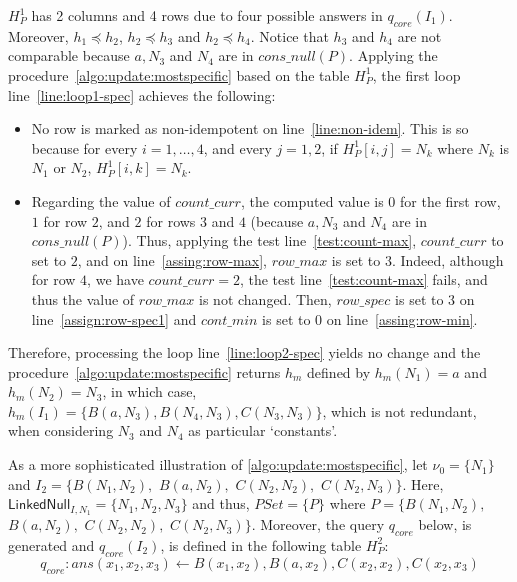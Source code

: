 \begin{example}
    $H_P^1$ has 2 columns and 4 rows due to four possible answers in $q_{core}(I_1)$.
    Moreover, $h_1 \preceq h_2$, $h_2 \preceq h_3$ and $h_2 \preceq h_4$.
    Notice that $h_3$ and $h_4$ are not comparable because $a, N_3$ and $N_4$ are in $cons\_null(P)$.
    Applying the procedure~\ref{algo:update:mostspecific} based on the table $H_P^1$, the first loop line~\ref{line:loop1-spec} achieves the following:
    \begin{itemize}
        \item
              No row is marked as non-idempotent on line~\ref{line:non-idem}.
              This is so because for every $i=1, \ldots, 4$, and every $j=1,2$, if $H^1_P[i,j]=N_k$ where $N_k$ is $N_1$ or $N_2$, $H^1_P[i,k]=N_k$.
        \item Regarding the value of $count\_curr$, the computed value is $0$ for the first row, $1$ for row $2$, and $2$ for rows $3$ and $4$ (because $a, N_3$ and $N_4$ are in $cons\_null(P)$).
              Thus, applying the test line~\ref{test:count-max}, $count\_curr$ to set to $2$, and on line~\ref{assing:row-max}, $row\_max$ is set to $3$.
              Indeed, although for row $4$, we have $count\_curr = 2$, the test line~\ref{test:count-max} fails, and thus the value of $row\_max$ is not changed.
              Then, $row\_spec$ is set to $3$ on line~\ref{assign:row-spec1} and $cont\_min$ is set to $0$ on line~\ref{assing:row-min}.
    \end{itemize}
    Therefore, processing the loop line~\ref{line:loop2-spec} yields no change and the procedure~\ref{algo:update:mostspecific} returns $h_m$ defined by $h_m(N_1)=a$ and $h_m(N_2)=N_3$, in which case, $h_m(I_1)=\{B(a, N_3), B(N_4,N_3), C(N_3,N_3)\}$, which is not redundant, when considering $N_3$ and $N_4$ as particular `constants'.

    As a more sophisticated illustration of \ref{algo:update:mostspecific}, let $\nu_0=\{N_1\}$ and $I_2= \{B(N_1, N_2),$ $B(a, N_2),$ $C(N_2,N_2),$ $C(N_2,N_3)\}$.
    Here, $\textsf{LinkedNull}_{I,N_1}=\{N_1,N_2, N_3\}$ and thus, $PSet = \{P\}$ where $P=\{B(N_1, N_2),$ $B(a,N_2),$ $C(N_2,N_2),$ $C(N_2,N_3)\}$.
    Moreover, the query $q_{core}$ below, is generated and $q_{core}(I_2)$, is defined in the following table $H^2_P$:
    \[
        q_{core}:ans(x_1,x_2,x_3) \leftarrow B(x_1, x_2), B(a,x_2),C(x_2,x_2),C(x_2,x_3)
    \]


\end{example}
